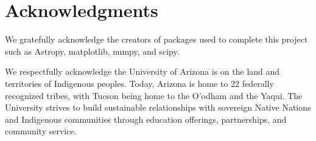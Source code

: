 \documentclass[fleqn,usenatbib]{mnras}
\begin{document}
\section{Acknowledgments}

We gratefully acknowledge the creators of packages used to complete this project such as Astropy, matplotlib, numpy, and scipy. \cite{Price-Whelan_2018, 2007CSE.....9...90H, 2011CSE....13b..22V, 2020SciPy-NMeth} 

We respectfully acknowledge the University of Arizona is on the land and territories of Indigenous peoples. Today, Arizona is home to 22 federally recognized tribes, with Tucson being home to the O’odham and the Yaqui. The University strives to build sustainable relationships with sovereign Native Nations and Indigenous communities through education offerings, partnerships, and community service.










\label{lastpage}
\end{document}

